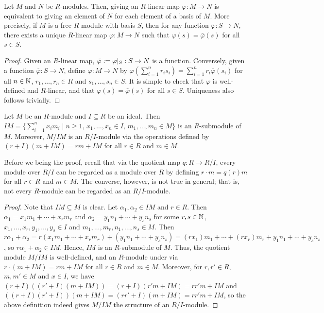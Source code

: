 \begin{proposition}
    Let $M$ and $N$ be $R$-modules. Then, giving an $R$-linear map $\varphi:M \to N$ is equivalent to giving an element of $N$ for each element of a basis of $M$. More precisely, if $M$ is a free $R$-module with basis $S$, then for any function $\bar{\varphi} : S \to N$, there exists a unique $R$-linear map $\varphi : M \to N$ such that $\varphi(s) = \bar{\varphi}(s)$ for all $s \in S$.
\end{proposition}

\begin{proof}
    Given an $R$-linear map, $\bar{\varphi} \vcentcolon= \varphi|_{S} : S \to N$ is a function. Conversely, given a function $\bar{\varphi} : S \to N$, define $\varphi : M \to N$ by $\varphi(\sum_{i=1}^{n} r_{i}s_{i}) = \sum_{i=1}^{n} r_{i}\bar{\varphi}(s_{i})$ for all $n \in \mathbb{N}$, $r_{1},\ldots,r_{n} \in R$ and $s_{1},\ldots,s_{n} \in S$. It is simple to check that $\varphi$ is well-defined and $R$-linear, and that $\varphi(s) = \bar{\varphi}(s)$ for all $s \in S$. Uniqueness also follows trivially.
\end{proof}

\begin{proposition}
    Let $M$ be an $R$-module and $I \subseteq R$ be an ideal. Then $IM = \{\sum_{i=1}^{n} x_{i}m_{i} \mid n \geq 1, \, x_{1},\ldots,x_{n} \in I, \, m_{1},\ldots,m_{n} \in M\}$ is an $R$-submodule of $M$. Moreover, $M/IM$ is an $R/I$-module via the operations defined by $(r+I)(m+IM) = rm + IM$ for all $r \in R$ and $m \in M$.
\end{proposition}

Before we being the proof, recall that via the quotient map $q:R \to R/I$, every module over $R/I$ can be regarded as a module over $R$ by defining $r \cdot m = q(r)m$ for all $r \in R$ and $m \in M$. The converse, however, is not true in general; that is, not every $R$-module can be regarded as an $R/I$-module.

\begin{proof}
    Note that $IM \subseteq M$ is clear. Let $\alpha_{1},\alpha_{2} \in IM$ and $r \in R$. Then $\alpha_{1} = x_{1}m_{1} + \cdots + x_{r}m_{r}$ and $\alpha_{2} = y_{1}n_{1} + \cdots + y_{s}n_{s}$ for some $r,s \in \mathbb{N}$, $x_{1},\ldots,x_{r},y_{1},\ldots,y_{s} \in I$ and $m_{1},\ldots,m_{r},n_{1},\ldots,n_{s} \in M$. Then $r\alpha_{1} + \alpha_{2} = r(x_{1}m_{1} + \cdots + x_{r}m_{r}) + (y_{1}n_{1} + \cdots + y_{s}n_{s}) = (rx_{1})m_{1} + \cdots + (rx_{r})m_{r} + y_{1}n_{1} + \cdots + y_{s}n_{s}$, so $r\alpha_{1} + \alpha_{2} \in IM$. Hence, $IM$ is an $R$-submodule of $M$. Thus, the quotient module $M/IM$ is well-defined, and an $R$-module under via $r \cdot (m + IM) = rm + IM$ for all $r \in R$ and $m \in M$. Moreover, for $r,r' \in R$, $m,m' \in M$ and $x \in I$, we have $(r+I)((r'+I)(m+IM)) = (r+I)(r'm + IM) = rr'm + IM$ and $((r+I)(r'+I))(m+IM) = (rr' + I)(m+IM) = rr'm + IM$, so the above definition indeed gives $M/IM$ the structure of an $R/I$-module.
\end{proof}

